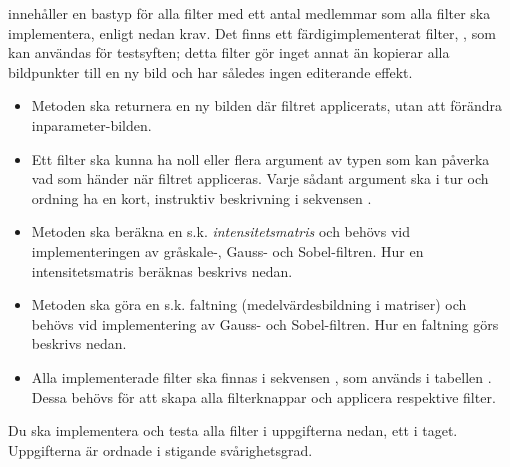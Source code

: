 
\noindent {} innehåller en bastyp för alla filter med ett antal medlemmar som alla filter ska implementera, enligt nedan krav. Det finns ett färdigimplementerat filter, , som kan användas för testsyften; detta filter gör inget annat än kopierar alla bildpunkter till en ny bild och har således ingen editerande effekt.

\begin{itemize}
\item Metoden  ska returnera en ny bilden där filtret applicerats, utan att förändra inparameter-bilden. 

\item Ett filter ska kunna ha noll eller flera argument av typen  som kan påverka vad som händer när filtret appliceras. Varje sådant argument ska i tur och ordning ha en kort, instruktiv beskrivning i sekvensen .

\item Metoden  ska beräkna en s.k. \emph{intensitetsmatris} och behövs vid implementeringen av gråskale-, Gauss- och Sobel-filtren. Hur en intensitetsmatris beräknas beskrivs nedan. 

\item Metoden  ska göra en s.k. faltning (medelvärdesbildning i matriser) och behövs vid implementering av Gauss- och Sobel-filtren. Hur en faltning görs beskrivs nedan.

\item Alla implementerade filter ska finnas i sekvensen , som används i tabellen . Dessa behövs för att skapa alla filterknappar och applicera respektive filter.
\end{itemize}

\noindent Du ska implementera och testa alla filter i uppgifterna nedan, ett i taget. Uppgifterna är ordnade i stigande svårighetsgrad.

